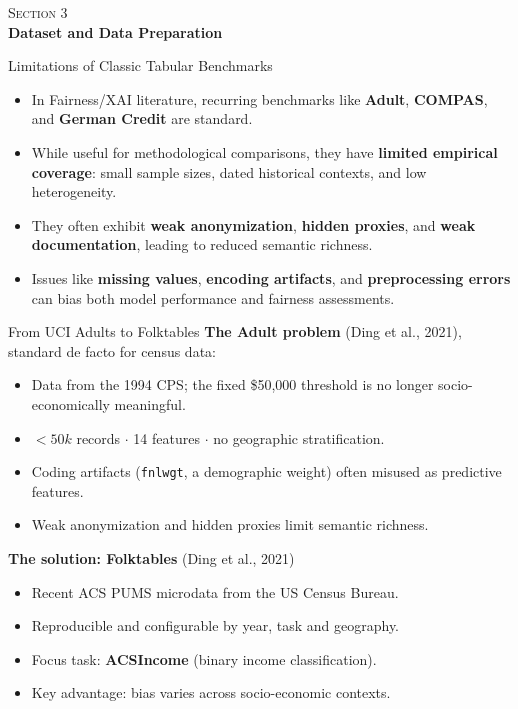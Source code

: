 \documentclass[10pt,aspectratio=169]{beamer}
\begin{document}
{
\begin{frame}[plain]
  \centering
  \vfill
  {\color{parthenopeblue}\large\textsc{Section 3}}\\[10pt]
  {\color{parthenopenavy}\Huge\bfseries Dataset and Data Preparation}
  \vfill
\end{frame}}

\begin{frame}{Limitations of Classic Tabular Benchmarks}
  \begin{itemize}
    \item In Fairness/XAI literature, recurring benchmarks like \textbf{Adult}, \textbf{COMPAS}, and \textbf{German Credit} are standard.
    \item While useful for methodological comparisons, they have \textbf{limited empirical coverage}: small sample sizes, dated historical contexts, and low heterogeneity.
    \item They often exhibit \textbf{weak anonymization}, \textbf{hidden proxies}, and \textbf{weak documentation}, leading to reduced semantic richness.
    \item Issues like \textbf{missing values}, \textbf{encoding artifacts}, and \textbf{preprocessing errors} can bias both model performance and fairness assessments.
  \end{itemize}
\end{frame}

\begin{frame}{From UCI Adults to Folktables}
  \textbf{The Adult problem} (Ding et al., 2021), standard de facto for census data:
  \begin{itemize}\small
    \item Data from the 1994 CPS; the fixed \$50{,}000 threshold is no longer socio-economically meaningful.
    \item $< 50k$ records $\cdot$ 14 features $\cdot$ no geographic stratification.
    \item Coding artifacts (\texttt{fnlwgt}, a demographic weight) often misused as predictive features.
    \item Weak anonymization and hidden proxies limit semantic richness.
  \end{itemize}
  \medskip
  \textbf{The solution: Folktables} (Ding et al., 2021)
  \begin{itemize}\small
    \item Recent ACS PUMS microdata from the US Census Bureau.
    \item Reproducible and configurable by year, task and geography.
    \item Focus task: \textbf{ACSIncome} (binary income classification).
    \item Key advantage: bias varies across socio-economic contexts.
  \end{itemize}
\end{frame}
\end{document}
